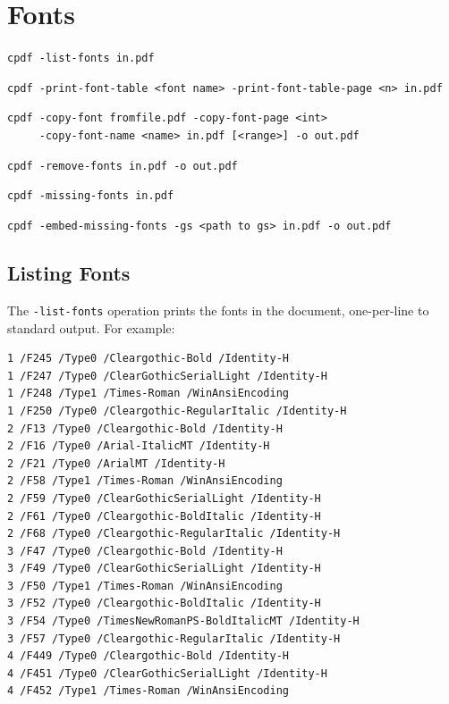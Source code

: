\documentclass{book}
\begin{document}
\chapter{Fonts}\pagestyle{fancy}\label{chap:14}
 {\small \begin{framed}

  \small\noindent\verb!cpdf -list-fonts in.pdf!

  \vspace{1.5mm}
  \noindent\verb!cpdf -print-font-table <font name> -print-font-table-page <n> in.pdf!
  
  \vspace{1.5mm}
  \noindent\verb!cpdf -copy-font fromfile.pdf -copy-font-page <int>!\\
  \noindent\verb!     -copy-font-name <name> in.pdf [<range>] -o out.pdf!

  \vspace{1.5mm}
  \noindent\verb!cpdf -remove-fonts in.pdf -o out.pdf!

  \vspace{1.5mm}
  \noindent\verb!cpdf -missing-fonts in.pdf!

  \vspace{1.5mm}
  \noindent\verb!cpdf -embed-missing-fonts -gs <path to gs> in.pdf -o out.pdf!
  \end{framed}}

\section{Listing Fonts}

\label{listingfonts}
  The \texttt{-list-fonts} operation prints the fonts in the document,
one-per-line to standard output. For example:
\begin{framed}\small\begin{verbatim}1 /F245 /Type0 /Cleargothic-Bold /Identity-H
1 /F247 /Type0 /ClearGothicSerialLight /Identity-H
1 /F248 /Type1 /Times-Roman /WinAnsiEncoding
1 /F250 /Type0 /Cleargothic-RegularItalic /Identity-H
2 /F13 /Type0 /Cleargothic-Bold /Identity-H
2 /F16 /Type0 /Arial-ItalicMT /Identity-H
2 /F21 /Type0 /ArialMT /Identity-H
2 /F58 /Type1 /Times-Roman /WinAnsiEncoding
2 /F59 /Type0 /ClearGothicSerialLight /Identity-H
2 /F61 /Type0 /Cleargothic-BoldItalic /Identity-H
2 /F68 /Type0 /Cleargothic-RegularItalic /Identity-H
3 /F47 /Type0 /Cleargothic-Bold /Identity-H
3 /F49 /Type0 /ClearGothicSerialLight /Identity-H
3 /F50 /Type1 /Times-Roman /WinAnsiEncoding
3 /F52 /Type0 /Cleargothic-BoldItalic /Identity-H
3 /F54 /Type0 /TimesNewRomanPS-BoldItalicMT /Identity-H
3 /F57 /Type0 /Cleargothic-RegularItalic /Identity-H
4 /F449 /Type0 /Cleargothic-Bold /Identity-H
4 /F451 /Type0 /ClearGothicSerialLight /Identity-H
4 /F452 /Type1 /Times-Roman /WinAnsiEncoding
\end{verbatim}
\end{framed}
\end{document}
